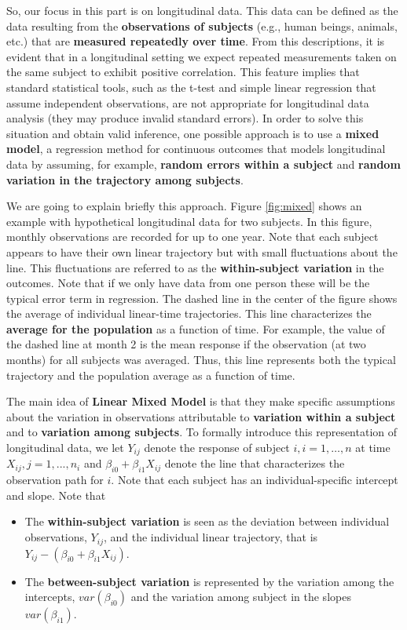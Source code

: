 \documentclass[]{book}
\theoremstyle{definition}
\theoremstyle{definition}
\theoremstyle{definition}
\theoremstyle{remark}
\begin{document}
So, our focus in this part is on longitudinal data. This data can be
defined as the data resulting from the \textbf{observations of subjects}
(e.g., human beings, animals, etc.) that are \textbf{measured repeatedly
over time}. From this descriptions, it is evident that in a longitudinal
setting we expect repeated measurements taken on the same subject to
exhibit positive correlation. This feature implies that standard
statistical tools, such as the t-test and simple linear regression that
assume independent observations, are not appropriate for longitudinal
data analysis (they may produce invalid standard errors). In order to
solve this situation and obtain valid inference, one possible approach
is to use a \textbf{mixed model}, a regression method for continuous
outcomes that models longitudinal data by assuming, for example,
\textbf{random errors within a subject} and \textbf{random variation in
the trajectory among subjects}.

We are going to explain briefly this approach. Figure \ref{fig:mixed}
shows an example with hypothetical longitudinal data for two subjects.
In this figure, monthly observations are recorded for up to one year.
Note that each subject appears to have their own linear trajectory but
with small fluctuations about the line. This fluctuations are referred
to as the \textbf{within-subject variation} in the outcomes. Note that
if we only have data from one person these will be the typical error
term in regression. The dashed line in the center of the figure shows
the average of individual linear-time trajectories. This line
characterizes the \textbf{average for the population} as a function of
time. For example, the value of the dashed line at month 2 is the mean
response if the observation (at two months) for all subjects was
averaged. Thus, this line represents both the typical trajectory and the
population average as a function of time.

The main idea of \textbf{Linear Mixed Model} is that they make specific
assumptions about the variation in observations attributable to
\textbf{variation within a subject} and to \textbf{variation among
subjects}. To formally introduce this representation of longitudinal
data, we let \(Y_{ij}\) denote the response of subject
\(i, i = 1, \ldots, n\) at time \(X_{ij}, j = 1,...,n_i\) and
\(\beta_{i0} + \beta_{i1} X_{ij}\) denote the line that characterizes
the observation path for \(i\). Note that each subject has an
individual-specific intercept and slope. Note that

\begin{itemize}
\item
  The \textbf{within-subject variation} is seen as the deviation between
  individual observations, \(Y_{ij}\), and the individual linear
  trajectory, that is \(Y_{ij} - (\beta_{i0} + \beta_{i1} X_{ij})\).
\item
  The \textbf{between-subject variation} is represented by the variation
  among the intercepts, \(var(\beta_{i0})\) and the variation among
  subject in the slopes \(var(\beta_{i1})\).
\end{itemize}
\end{document}
